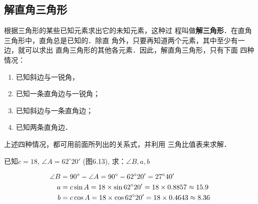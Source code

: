 \subsection{解直角三角形}
根据三角形的某些已知元素求出它的未知元素，这种过
程叫做\textbf{解三角形}．在直角三角形中，直角总是已知的．除直
角外，只要再知道两个元素，其中至少有一边，就可以求出
直角三角形的其他各元素．因此，解直角三角形，只有下面
四种情况：
\begin{enumerate}
    \item 已知斜边与一锐角，
    \item 已知一条直角边与一锐角；
    \item 已知斜边与一条直角边；
    \item 已知两条直角边．
\end{enumerate}

上述四种情况，都可用前面所列出的关系式，并利用
三角比值表来求解．

\begin{example}
    已知$c=18$, $\angle A=62^{\circ}20'$ (图6.13),
求：$\angle B, a, b$
\end{example}

\begin{solution}
\[\begin{split}
    \angle B&=90^{\circ}-\angle A=90^{\circ}-62^{\circ}20'
=27^{\circ}40'\\
a&=c\sin A=18\times \sin62^{\circ}20'=18\times0.8857
\approx 15.9\\
b&=c\cos A=18\times\cos62^{\circ}20'=18\times0.4643\approx 8.36
\end{split}\]
\end{solution}

\begin{figure}[htp]\centering
    \begin{minipage}[t]{0.48\textwidth}
    \centering
{}
    \caption{}
    \end{minipage}
    \begin{minipage}[t]{0.48\textwidth}
    \centering
    \caption{}
    \end{minipage}
    \end{figure}


